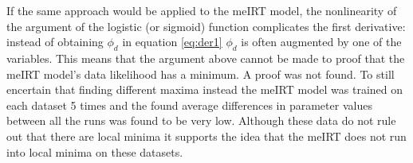 \documentclass{scrartcl}
\newcommand\todo[1]{\textit{\textcolor{red}{#1}}}
\begin{document}
If the same approach would be applied to the meIRT model, the nonlinearity of the argument of the logistic (or sigmoid) function complicates the first derivative: instead of obtaining $\phi_{d}$ in equation \ref{eq:der1} $\phi_{d}$ is often augmented by one of the variables. This means that the argument above cannot be made to proof that the meIRT model's data likelihood has a minimum. A proof was not found. To still encertain that finding different maxima instead the meIRT model was trained on each dataset 5 times and the found average differences in parameter values between all the runs was found to be very low. Although these data do not rule out that there are local minima it supports the idea that the meIRT does not run into local minima on these datasets.

\end{document}
